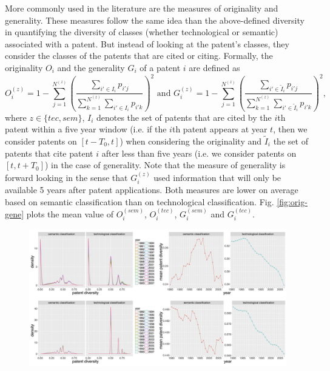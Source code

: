 More commonly used in the literature are the measures of originality and generality. These measures follow the same idea than the above-defined diversity in quantifying the diversity of classes (whether technological or semantic) associated with a patent. But instead of looking at the patent's classes, they consider the classes of the patents that are cited or citing. Formally, the originality $O_i$ and the generality $G_i$ of a patent $i$ are defined as
\[
O_i^{(z)} = \displaystyle 1 - \sum_{j =1}^{N^{(z)}}{\left(\frac{\displaystyle \sum_{i' \in I_i}{p_{i'j}}}{\displaystyle \sum_{k =1}^{N^{(z)}}{\displaystyle \sum_{i' \in I_i}{p_{i'k}}}}\right)^2} \text{ and } G_i^{(z)} = \displaystyle 1 - \sum_{j =1}^{N^{(z)}}{\left(\frac{\displaystyle \sum_{i' \in \tilde{I}_i}{p_{i'j}}}{\displaystyle \sum_{k =1}^{N^{(z)}}{\displaystyle \sum_{i' \in \tilde{I}_i}{p_{i'k}}}}\right)^2}, 
\]
where $z \in \{tec, sem\}$, $I_i$ denotes the set of patents that are cited by the $i$th patent within a five year window (i.e. if the $i$th patent appears at year $t$, then we consider patents on $[t-T_0, t]$) when considering the originality and $\tilde{I}_i$ the set of patents that cite patent $i$ after less than five years (i.e. we consider patents on $[t ,t + T_0]$) in the case of generality. Note that the measure of generality is forward looking in the sense that $G_i^{(z)}$ used information that will only be available 5 years after patent applications. Both measures are lower on average based on semantic classification than on technological classification. Fig. \ref{fig:orig-gene} plots the mean value of $O_i^{(sem)}$, $O_i^{(tec)}$, $G_i^{(sem)}$ and $G_i^{(tec)}$.

\begin{figure}
\includegraphics[width=\linewidth]{Figures/Final/C-patentsmining-patent-level-orig.jpg}
\label{fig:patentsmining:patent-level-orig}
\end{figure}


